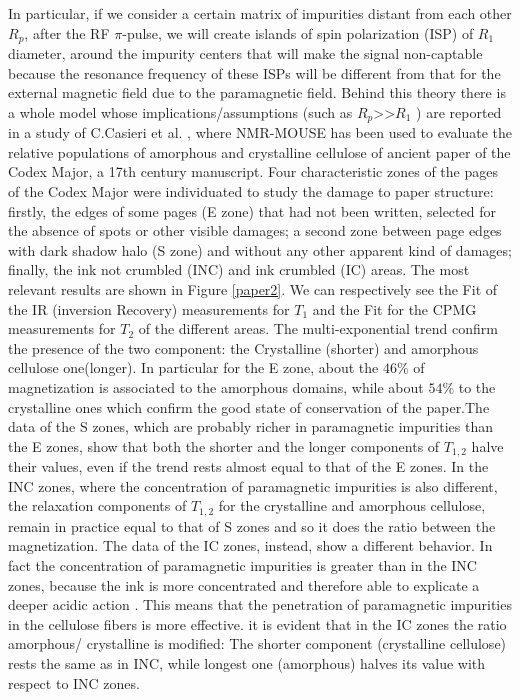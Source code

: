 \documentclass[a4paper,11pt]{report}
\begin{document}
In particular, if we consider a certain matrix of impurities distant from each other $R_p$, after the RF $\pi$-pulse, we will create islands of spin polarization (ISP) of $R_1$ diameter, around the impurity centers that will make the signal non-captable because the resonance frequency of these ISPs will be different from that for the external magnetic field due to the paramagnetic field. Behind this theory there is a whole model whose implications/assumptions (such as $R_p$>>$R_1$ ) are reported in a study of C.Casieri et al. \cite{duepaper}, where NMR-MOUSE has been used to evaluate the relative populations of amorphous and crystalline cellulose of ancient paper of the  Codex Major, a 17th century manuscript. Four characteristic zones of the pages of the Codex Major were individuated to study the damage to paper structure: firstly, the edges of some pages (E zone) that had not been written, selected for the absence of spots or other visible damages; a second zone between page edges with dark shadow halo (S zone) and without any other apparent kind of damages; finally, the ink not crumbled (INC) and ink crumbled (IC)  areas. The most relevant results are shown in Figure \ref{paper2}. We can respectively see the Fit of the IR (inversion Recovery)  measurements for $T_1$ and the Fit for the CPMG measurements for $T_2$ of the different areas. The multi-exponential trend confirm the presence of the two component:  the Crystalline (shorter) and amorphous cellulose one(longer). In particular for the E zone, about the $46\%$ of magnetization is associated to the amorphous domains, while about $54\%$ to the crystalline ones which confirm the good state of conservation of the paper.The data of the S zones, which are probably richer in paramagnetic impurities than the E zones, show that both the shorter and the longer components of $T_{1,2}$ halve their values, even if the trend rests almost equal to that of the E zones. In the INC zones, where the concentration of paramagnetic impurities is also different, the relaxation components of $T_{1,2}$ for the crystalline and amorphous cellulose, remain in practice equal to that of S zones and so it does the ratio between the magnetization.
The data of the IC zones, instead, show a different behavior. In fact the concentration of paramagnetic impurities is greater than in the INC zones, because the ink is more concentrated and therefore able to explicate a deeper acidic action . This means that the penetration of paramagnetic impurities in the cellulose fibers is more effective. it is evident that in the IC zones the ratio amorphous/ crystalline is modified: The shorter component (crystalline cellulose) rests the same as in INC, while longest one (amorphous) halves its value with respect to INC zones.
\end{document}
